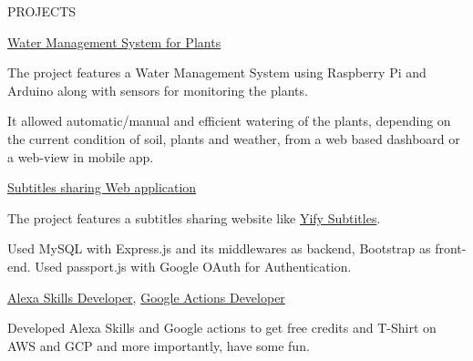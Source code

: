 \documentclass{resume} %
\begin{document}
\begin{rSection}{PROJECTS}

\begin{rSubsection}{\href{https://github.com/anuragiiits/Water-Management-System}{Water Management System for Plants}}{}{}{}
\item The project features a Water Management System using Raspberry Pi and Arduino along with sensors for monitoring the plants. 
\item It allowed automatic/manual and efficient watering of the plants, depending on the current condition of soil, plants and weather, from a web based dashboard or a web-view in mobile app.
\end{rSubsection}

\begin{rSubsection}{\href{https://github.com/AnubhavUjjawal/dbmsMini-1}{Subtitles sharing Web application}}{}{}{}
\item The project features a subtitles sharing website like \href{https://www.yifysubtitles.com/}{Yify Subtitles}. 
\item Used MySQL with Express.js and its middlewares as backend, Bootstrap as front-end. Used passport.js with Google OAuth for Authentication.
\end{rSubsection}

\begin{rSubsection}{\href{https://www.amazon.in/Anubhav-Ujjawal-Latest-HackerNews-Articles/dp/B07K1X4WXW}{Alexa Skills Developer}, \href{https://assistant.google.com/services/a/uid/000000b6cb59ef4f?hl=en-GB}{Google Actions Developer}}{}{}{}
\item Developed Alexa Skills and Google actions to get free credits and T-Shirt on AWS and GCP and more importantly, have some fun. 
\end{rSubsection}
\end{rSection}
\end{document}
